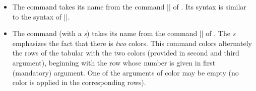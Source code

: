 \documentclass[dvipsnames]{article}%
\begin{document}
\begin{itemize}
\medskip
\begin{scope}
\hfuzz = 10cm
\begin{Code}[width=9cm]
$\begin{NiceArray}{lll}[hvlines] 
\CodeBefore
  \emph{\rowcolor{red!15}{1,3-5,8-}}
\Body
a_1 & b_1 & c_1 \\
a_2 & b_2 & c_2 \\
a_3 & b_3 & c_3 \\
a_4 & b_4 & c_4 \\
a_5 & b_5 & c_5 \\
a_6 & b_6 & c_6 \\
a_7 & b_7 & c_7 \\
a_8 & b_8 & c_8 \\
a_9 & b_9 & c_9 \\
a_{10} & b_{10} & c_{10} \\
\end{NiceArray}$
\end{Code}
$\begin{NiceArray}{lll}[baseline=4,hvlines] 
\CodeBefore 
\rowcolor{red!15}{1,3-5,8-}
\Body
a_1 & b_1 & c_1 \\
a_2 & b_2 & c_2 \\
a_3 & b_3 & c_3 \\
a_4 & b_4 & c_4 \\
a_5 & b_5 & c_5 \\
a_6 & b_6 & c_6 \\
a_7 & b_7 & c_7 \\
a_8 & b_8 & c_8 \\
a_9 & b_9 & c_9 \\
a_{10} & b_{10} & c_{10} \\
\end{NiceArray}$
\end{scope}


\bigskip
\item The command  takes its name from
the command |\columncolor| of . Its syntax is similar to the
syntax of |\rowcolor|.

\bigskip
\item The command  (with a \emph{s})
takes its name from the command |\rowcolors| of . The \emph{s}
emphasizes the fact that there is \emph{two} colors. This command colors
alternately the rows of the tabular with the two colors (provided in second
and third argument), beginning with the row whose number is given in first
(mandatory) argument. One of the arguments of color may be empty (no color is
applied in the corresponding rows).


\end{itemize}
\end{document}
